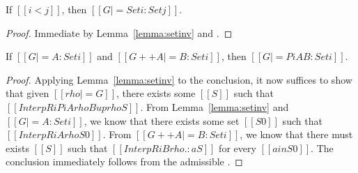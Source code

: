 \documentclass[acmsmall,screen=true,
\ifpublic review=false\else,review=true\fi
  ,anonymous=\ifanonymous true\else false\fi]{acmart}
\newcommand{\scw}[1]{}
\begin{document}





\begin{lemma}[ST-Set]
  \label{lemma:stset}
  If $[[i < j]]$, then $[[G |= Set i : Set j]]$.
\end{lemma}
\begin{proof}
  Immediate by Lemma~\ref{lemma:setinv} and .
\end{proof}

\begin{lemma}[ST-Pi]
  \label{lemma:stpi}
  If $[[G |= A : Set i]]$ and $[[G ++ A |= B : Set i]]$, then $[[G |= Pi
  A B : Set i]]$.
\end{lemma}
\begin{proof}
  Applying Lemma~\ref{lemma:setinv} to the
  conclusion, it now suffices to show that given $[[rho |= G]]$, there
  exists some $[[S]]$ such that $[[InterpR i Pi A{rho} B{up rho} S]]$.
  From Lemma~\ref{lemma:setinv} and $[[G |= A : Set i]]$, we know that
  there exists some set $[[S0]]$ such that $[[InterpR i A {rho} S0]]$.
From $[[G ++ A |= B : Set i]]$, we know that there must
exists $[[S]]$ such that $[[InterpR i B {rho .: a} S]]$ for every $[[a
in S0]]$. The conclusion immediately follows from the admissible .
\end{proof}
\end{document}

